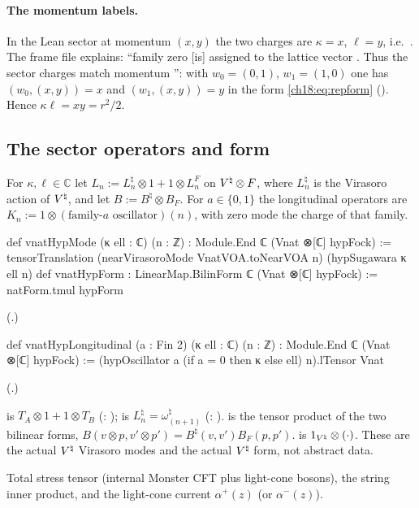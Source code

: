 \paragraph{The momentum labels.}  In the Lean sector at momentum $(x,y)$ the two charges are
$\kappa=x$, $\ell=y$, i.e.\ .  The frame file
 explains: ``family zero [is] assigned to the
lattice vector .  Thus the sector charges  match momentum '':
with $w_0=(0,1)$, $w_1=(1,0)$ one has $(w_0,(x,y))=x$ and $(w_1,(x,y))=y$ in the form
\eqref{ch18:eq:repform} ().  Hence $\kappa\ell=xy=r^2/2$.

\subsection{The sector operators and form}

\begin{definition}\label{ch18:def:sectorops}
For $\kappa,\ell\in\mathbb C$ let $L_n:=L^\natural_n\otimes1+1\otimes L^F_n$ on ${V^{\natural}}\otimes F$, where $L^\natural_n$
is the Virasoro action of ${V^{\natural}}$, and let $B:=B^\natural\otimes B_F$.  For $a\in\{0,1\}$ the longitudinal operators are
$K_n:=1\otimes(\text{family-}a\text{ oscillator})(n)$, with zero mode the charge of that family.
\end{definition}
\begin{leancode}
def vnatHypMode (κ ell : ℂ) (n : ℤ) : Module.End ℂ (Vnat ⊗[ℂ] hypFock) :=
  tensorTranslation (nearVirasoroMode VnatVOA.toNearVOA n) (hypSugawara κ ell n)
def vnatHypForm : LinearMap.BilinForm ℂ (Vnat ⊗[ℂ] hypFock) := natForm.tmul hypForm
\end{leancode}
(.)
\begin{leancode}
def vnatHypLongitudinal (a : Fin 2) (κ ell : ℂ) (n : ℤ) :
    Module.End ℂ (Vnat ⊗[ℂ] hypFock) :=
  (hypOscillator a (if a = 0 then κ else ell) n).lTensor Vnat
\end{leancode}
(.)
\begin{dictionary}
 is $T_A\otimes1+1\otimes T_B$ (:
);  is
$L^\natural_n=\omega^\natural_{(n+1)}$ (:
).   is the tensor product of
the two bilinear forms, $B(v\otimes p,v'\otimes p')=B^\natural(v,v')B_F(p,p')$.   is
$1_{{V^{\natural}}}\otimes(\cdot)$.  These are the actual ${V^{\natural}}$ Virasoro modes and the actual ${V^{\natural}}$ form, not
abstract data.
\end{dictionary}
\begin{physics}
Total stress tensor (internal Monster CFT plus light-cone bosons), the string
inner product, and the light-cone current $\alpha^+(z)$ (or $\alpha^-(z)$).
\end{physics}

